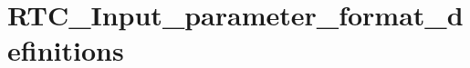 \hypertarget{group___r_t_c___input__parameter__format__definitions}{\section{R\-T\-C\-\_\-\-Input\-\_\-parameter\-\_\-format\-\_\-definitions}
\label{group___r_t_c___input__parameter__format__definitions}
}
